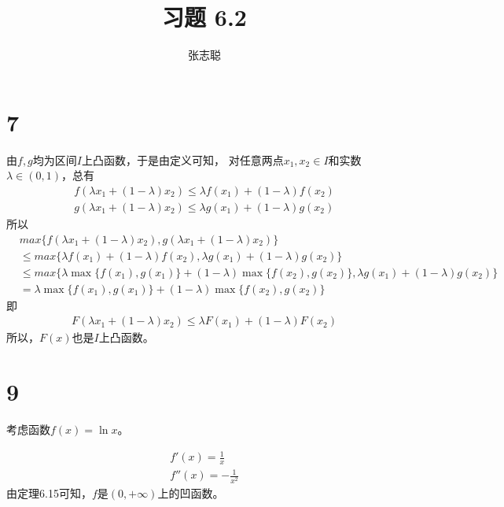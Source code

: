 \documentclass{article}
\begin{document}
\title{习题 6.2}
\author{张志聪}
\maketitle

\section*{7}

由$f, g$均为区间$I$上凸函数，于是由定义可知，
对任意两点$x_1, x_2 \in I$和实数$\lambda \in (0, 1)$，总有
\begin{align*}
  f(\lambda x_1 + (1 - \lambda) x_2) \leq \lambda f(x_1) + (1 - \lambda) f(x_2) \\
  g(\lambda x_1 + (1 - \lambda) x_2) \leq \lambda g(x_1) + (1 - \lambda) g(x_2)
\end{align*}
所以
\begin{align*}
   & max\{f(\lambda x_1 + (1 - \lambda) x_2), g(\lambda x_1 + (1 - \lambda) x_2)\}                                            \\
   & \leq max\{\lambda f(x_1) + (1 - \lambda) f(x_2), \lambda g(x_1) + (1 - \lambda) g(x_2)\}                                 \\
   & \leq max\{\lambda \max\{f(x_1), g(x_1)\} + (1 - \lambda) \max\{f(x_2), g(x_2)\}, \lambda g(x_1) + (1 - \lambda) g(x_2)\} \\
   & = \lambda \max\{f(x_1), g(x_1)\} + (1 - \lambda) \max\{f(x_2), g(x_2)\}
\end{align*}
即
\begin{align*}
  F(\lambda x_1 + (1 - \lambda) x_2) \leq \lambda F(x_1) + (1 - \lambda) F(x_2)
\end{align*}
所以，$F(x)$也是$I$上凸函数。

\section*{9}

考虑函数$f(x) = \ln x$。

\begin{align*}
  f'(x) = \frac{1}{x} \\
  f''(x) = -\frac{1}{x^2}
\end{align*}
由定理6.15可知，$f$是$(0, +\infty)$上的凹函数。
\end{document}
